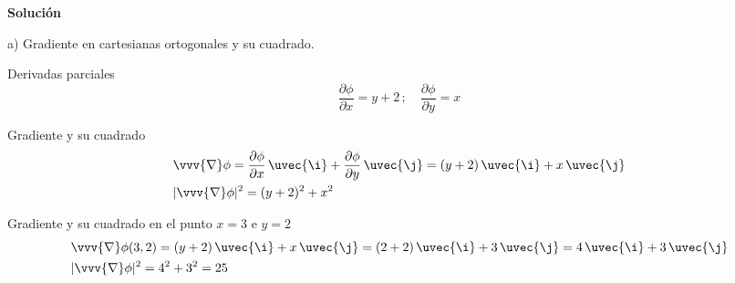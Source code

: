 \noindent
\textbf{Solución}

\noindent
a) Gradiente en cartesianas ortogonales y su cuadrado.

Derivadas parciales
\[
  \dfrac{\partial\phi}{\partial x} = y + 2
  \,;\hspace{1em}
  \dfrac{\partial\phi}{\partial y} = x
\]

Gradiente y su cuadrado
\begin{align*}
  &\vvv{\nabla}\phi
    = \dfrac{\partial\phi}{\partial x}\,\uvec{\i}
    + \dfrac{\partial\phi}{\partial y}\,\uvec{\j}
    = (y+2)\,\uvec{\i} + x\,\uvec{\j}\\
  &|\vvv{\nabla}\phi|^2
    = (y+2)^2 + x^2
\end{align*}
 
Gradiente y su cuadrado en el punto $x=3$ e $y=2$
\begin{align*}
  &\vvv{\nabla}\phi(3,2)
    = (y+2)\,\uvec{\i} + x\,\uvec{\j}
    = (2+2)\,\uvec{\i} + 3\,\uvec{\j}
    = 4\,\uvec{\i} + 3\,\uvec{\j}\\
  & |\vvv{\nabla}\phi|^2
    = 4^2 + 3^2
    = 25
\end{align*}

